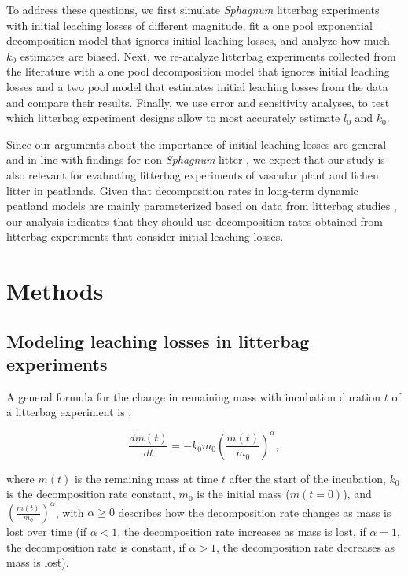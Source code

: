 \documentclass[bg, manuscript]{copernicus}
\begin{document}
To address these questions, we first simulate \emph{Sphagnum} litterbag experiments with initial leaching losses of different magnitude, fit a one pool exponential decomposition model that ignores initial leaching losses, and analyze how much \(k_0\) estimates are biased. Next, we re-analyze litterbag experiments collected from the literature with a one pool decomposition model that ignores initial leaching losses and a two pool model that estimates initial leaching losses from the data and compare their results. Finally, we use error and sensitivity analyses, to test which litterbag experiment designs allow to most accurately estimate \(l_0\) and \(k_0\).

Since our arguments about the importance of initial leaching losses are general and in line with findings for non-\emph{Sphagnum} litter \citep[e.g.,][]{Barlocher.1997, Lind.2022}, we expect that our study is also relevant for evaluating litterbag experiments of vascular plant and lichen litter in peatlands. Given that decomposition rates in long-term dynamic peatland models are mainly parameterized based on data from litterbag studies \citep[e.g.][]{Frolking.2001, Bauer.2004, Heijmans.2008, Heinemeyer.2010, Morris.2012, Chaudhary.2018, Bona.2020}, our analysis indicates that they should use decomposition rates obtained from litterbag experiments that consider initial leaching losses.

\section{Methods}

\hypertarget{out-methods-1}{%
\subsection{Modeling leaching losses in litterbag experiments}\label{out-methods-1}}

A general formula for the change in remaining mass with incubation duration \(t\) of a litterbag experiment is \citep{Frolking.2001}:

\begin{equation}
\frac{dm(t)}{dt} = -k_0 m_0 \left(\frac{m(t)}{m_0}\right)^\alpha,
\label{eq:decomposition-differential-1}
\end{equation}

where \(m(t)\) is the remaining mass at time \(t\) after the start of the incubation, \(k_0\) is the decomposition rate constant, \(m_0\) is the initial mass (\(m(t = 0)\)), and \(\left(\frac{m(t)}{m_0}\right)^\alpha\), with \(\alpha \ge 0\) describes how the decomposition rate changes as mass is lost over time (if \(\alpha<1\), the decomposition rate increases as mass is lost, if \(\alpha=1\), the decomposition rate is constant, if \(\alpha>1\), the decomposition rate decreases as mass is lost).
\end{document}
